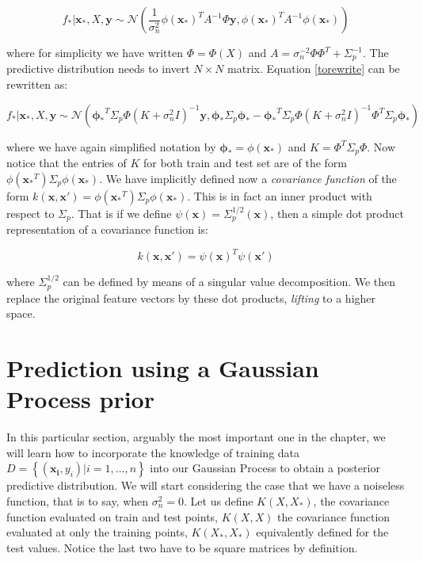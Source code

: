 \documentclass[10pt,a4paper,twoside]{book}
\begin{document}
\begin{equation}
\label{torewrite}
f_{*}|\boldsymbol{x}_{*}, X, \boldsymbol{y} \sim \mathcal{N}\left( \dfrac{1}{\sigma^2_n}\phi(\boldsymbol{x_*})^T A^{-1}\Phi \boldsymbol{y}, \phi(\boldsymbol{x_*})^T A^{-1}\phi(\boldsymbol{x_*})    \right)
\end{equation}

where for simplicity we have written $\Phi = \Phi(X)$ and $A = \sigma_n^{-2}\Phi\Phi^T + \Sigma_p^{-1}$. The predictive distribution needs to invert $N \times N$ matrix. Equation \ref{torewrite} can be rewritten as:

\begin{equation}
f_{*}|\boldsymbol{x}_{*}, X, \boldsymbol{y} \sim \mathcal{N}\left(\boldsymbol{\phi_*}^T\Sigma_p\Phi(K + \sigma^2_n I)^{-1}\boldsymbol{y}, \boldsymbol{\phi_*}\Sigma_p\boldsymbol{\phi_*} - \boldsymbol{\phi_*}^T\Sigma_p\Phi(K + \sigma^2_n I)^{-1}\Phi^T\Sigma_p\boldsymbol{\phi_*}\right)
\end{equation}

where we have again simplified notation by $\boldsymbol{\phi_*} = \phi(\boldsymbol{x_*})$ and $K = \Phi^T\Sigma_p\Phi$. Now notice that the entries of $K$ for both train and test set are of the form  $\phi(\boldsymbol{x_*}^T)\Sigma_p\phi(\boldsymbol{x_*})$. We have implicitly defined now a \textit{covariance function} of the form $k(\boldsymbol{x}, \boldsymbol{x'}) = \phi(\boldsymbol{x_*}^T)\Sigma_p\phi(\boldsymbol{x_*})$. This is in fact an inner product with respect to $\Sigma_p$. That is if we define $\psi(\boldsymbol{x}) = \Sigma_p^{1/2}(\boldsymbol{x})$, then a simple dot product representation of a covariance function is:

\begin{equation}
k(\boldsymbol{x}, \boldsymbol{x'}) = \psi(\boldsymbol{x})^T\psi(\boldsymbol{x'})
\end{equation}

where $\Sigma_p^{1/2}$ can be defined by means of a singular value decomposition. We then replace the original feature vectors by these dot products, \textit{lifting} to a higher space. 

\section{Prediction using a Gaussian Process prior}
\label{pred}

In this particular section, arguably the most important one in the chapter, we will learn how to incorporate the knowledge of training data $D = \left\lbrace \left(\boldsymbol{x_i}, y_i\right) | i = 1,\dots,n\right\rbrace$ into our Gaussian Process to obtain a posterior predictive distribution. We will start considering the case that we have a noiseless function, that is to say, when $\sigma^2_n = 0$. Let us define $K(X, X_{*})$, the covariance function evaluated on train and test points, $K(X, X)$ the covariance function evaluated at only the training points, $K(X_{*}, X_{*})$ equivalently defined for the test values. Notice the last two have to be square matrices by definition.\\
\end{document}
